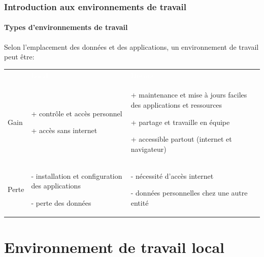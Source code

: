 \documentclass[xcolor=table]{beamer}
\begin{document}
\begin{frame}
\frametitle{Introduction aux environnements de travail}
\framesubtitle{Types d'environnements de travail}

Selon l'emplacement des données et des applications, un environnement de travail peut être: 


\begin{tabular}{p{}p{}p{}}
	\rowcolor{darkblue}
	& \textcolor{white}{Local} & \textcolor{white}{Distant} \\
	
	Gain &
	+ contrôle et accès personnel 
	
	+ accès sans internet

	 & 
	+ maintenance et mise à jours faciles des applications et ressources
	
	+ partage et travaille en équipe
	
	+ accessible partout (internet et navigateur)
	 \\
	
	Perte &
	- installation et configuration des applications
	
	- perte des données
	&
	- nécessité d'accès internet
	
	- données personnelles chez une autre entité 
	\\
\end{tabular}

\end{frame}

\section{Environnement de travail local}
\end{document}
